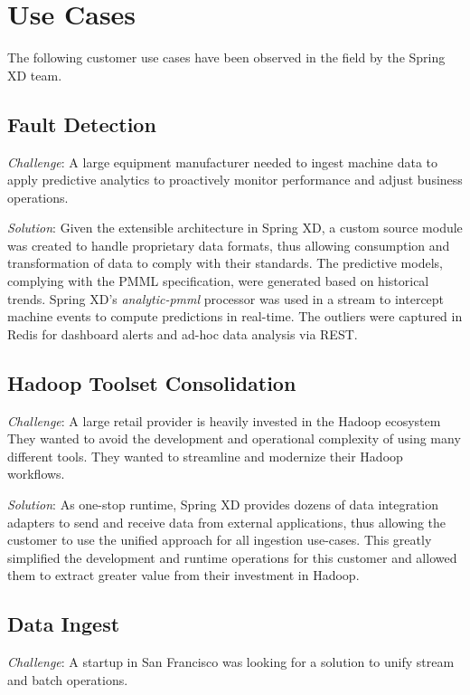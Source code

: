\section{Use Cases}
\label{sec:Use Cases}

The following customer use cases have been observed in the field by the Spring XD team.

\subsection{Fault Detection}
\textit{Challenge}: A large equipment manufacturer needed to
ingest machine data to apply predictive analytics to proactively monitor
performance and adjust business operations.

\textit{Solution}: Given the extensible architecture in Spring XD, a custom
source module was created to handle proprietary data formats, thus allowing
consumption and transformation of data to comply with their
standards. The predictive models, complying with the PMML specification, were
generated based on historical trends. Spring XD's \emph{analytic-pmml} processor was
used in a stream to intercept machine events to compute predictions in
real-time. The outliers were captured in Redis for dashboard alerts
and ad-hoc data analysis via REST.

\subsection{Hadoop Toolset Consolidation}

\textit{Challenge}: A large retail provider is heavily invested in the Hadoop ecosystem
They wanted to avoid the development and operational complexity of using many
different tools. They wanted to streamline and modernize their Hadoop workflows.

\textit{Solution}: As one-stop runtime, Spring XD provides dozens of data integration
adapters to send and receive data from external applications, thus allowing
the customer to use the unified approach for all ingestion use-cases. This
greatly simplified the development and runtime operations for this customer
and allowed them to extract greater value from their investment in Hadoop.

\subsection{Data Ingest}
\textit{Challenge}: A startup in San Francisco was looking for a solution to
unify stream and batch operations.

